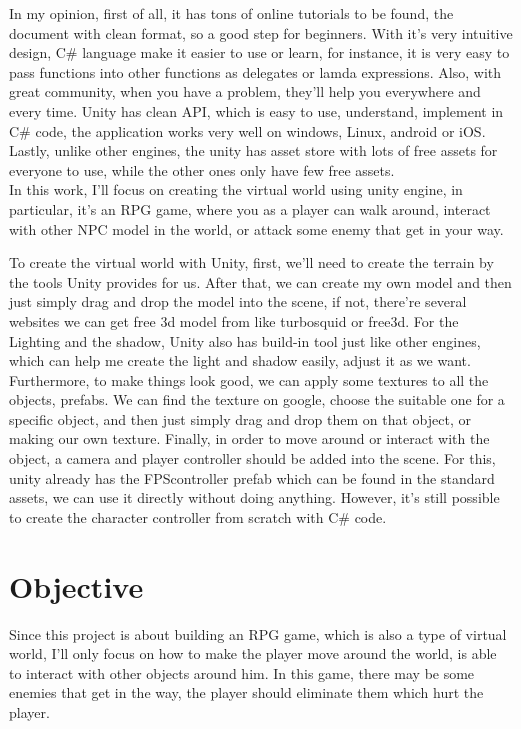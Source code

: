 \documentclass[a4paper, 13pt]{extarticle}
\begin{document}
 In my opinion, first of all, it has tons of online tutorials to be found, the document with clean format, so a good step for beginners. With it's very intuitive design, C\# language make it easier to use or learn, for instance, it is very easy to pass functions into other functions as delegates or lamda expressions. Also, with great community, when you have a problem, they'll help you everywhere and every time. Unity has clean API, which is easy to use, understand, implement in C\# code, the application works very well on windows, Linux, android or iOS. Lastly, unlike other engines, the unity has asset store with lots of free assets for everyone to use, while the other ones only have few free assets. \\[0.35cm]In this work, I'll focus on creating the virtual world using unity engine, in particular, it's an RPG game, where you as a player can walk around, interact with other NPC model in the world, or attack some enemy that get in your way. 
  

 To create the virtual world with Unity, first, we'll need to create the terrain by the tools Unity provides for us. After that, we can create my own model and then just simply drag and drop the model into the scene, if not, there're several websites we can get free 3d model from like turbosquid or free3d. For the Lighting and the shadow, Unity also has build-in tool just like other engines, which can help me create the light and shadow easily, adjust it as we want. Furthermore, to make things look good, we can apply some textures to all the objects, prefabs. We can find the texture on google, choose the suitable one for a specific object, and then just simply drag and drop them on that object, or making our own texture. Finally, in order to move around or interact with the object, a camera and player controller should be added into the scene. For this, unity already has the FPScontroller prefab which can be found in the standard assets, we can use it directly without doing anything. However, it's still possible to create the character controller from scratch with C\# code.
 \section{\Large Objective} 
 	Since this project is about building an RPG game, which is also a type of virtual world, I'll only focus on how to make the player move around the world, is able to interact with other objects around him. In this game, there may be some enemies that get in the way, the player should eliminate them which hurt the player. 
\end{document}
